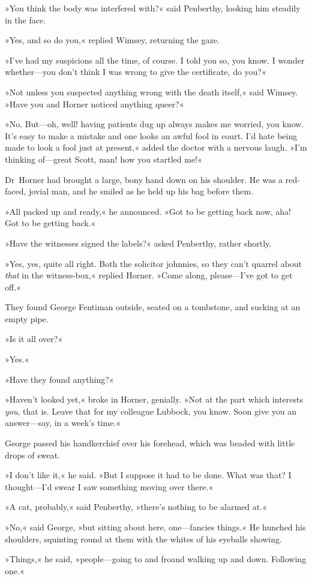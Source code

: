 »You think the body was interfered with?« said Penberthy, looking him steadily in the face.

»Yes, and so do you,« replied Wimsey, returning the gaze.

»I've had my suspicions all the time, of course. I told you so, you know. I wonder whether—you don't think I was wrong to give the certificate, do you?«

»Not unless you suspected anything wrong with the death itself,« said Wimsey. »Have you and Horner noticed anything queer?«

»No. But—oh, well! having patients dug up always makes me worried, you know. It's easy to make a mistake and one looks an awful fool in court. I'd hate being made to look a fool just at present,« added the doctor with a nervous laugh. »I'm thinking of—great Scott, man! how you startled me!«

Dr~Horner had brought a large, bony hand down on his shoulder. He was a red-faced, jovial man, and he smiled as he held up his bag before them.

»All packed up and ready,« he announced. »Got to be getting back now, aha! Got to be getting back.«

»Have the witnesses signed the labels?« asked Penberthy, rather shortly.

»Yes, yes, quite all right. Both the solicitor johnnies, so they can't quarrel about \textit{that} in the witness-box,« replied Horner. »Come along, please—I've got to get off.«

They found George Fentiman outside, seated on a tombstone, and sucking at an empty pipe.

»Is it all over?«

»Yes.«

»Have they found anything?«

»Haven't looked yet,« broke in Horner, genially. »Not at the part which interests \textit{you}, that is. Leave that for my colleague Lubbock, you know. Soon give you an answer—say, in a week's time.«

George passed his handkerchief over his forehead, which was beaded with little drops of sweat.

»I don't like it,« he said. »But I suppose it had to be done. What was that? I thought—I'd swear I saw something moving over there.«

»A cat, probably,« said Penberthy, »there's nothing to be alarmed at.«

»No,« said George, »but sitting about here, one—fancies things.« He hunched his shoulders, squinting round at them with the whites of his eyeballs showing.

»Things,« he said, »people—going to and fro\textellipsis  and walking up and down. Following one.«